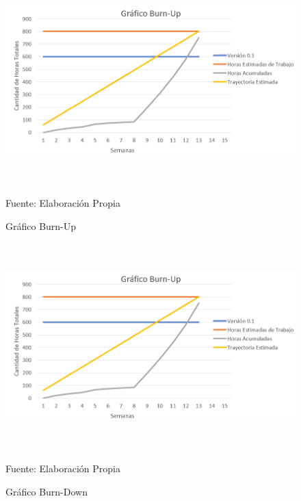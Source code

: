 \newpage
\begin{figure}[t!]
	\centering
	\includegraphics[width=14cm,height=8cm,]{./Images/graficoburnup.png}
	\caption{Gráfico Burn-Up}
	\footnotesize Fuente: Elaboración Propia
	\label{burnup}
\end{figure}
\begin{figure}[t!]
	\centering
	\includegraphics[width=14cm,height=8cm,]{./Images/graficoburnup.png}
	\caption{Gráfico Burn-Down}
	\footnotesize Fuente: Elaboración Propia
	\label{burndown}
\end{figure}

